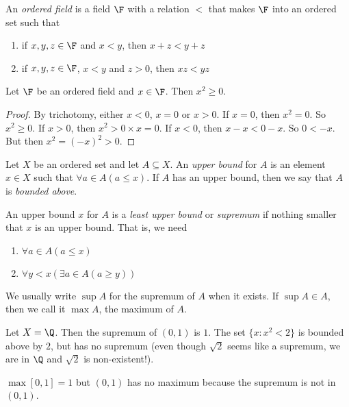 \documentclass[a4paper]{article}
\begin{document}
\begin{defi}
  An \emph{ordered field} is a field $\F$ with a relation $<$ that makes $\F$ into an ordered set such that
  \begin{enumerate}
    \item if $x, y, z \in \F$ and $x < y$, then $x + z < y + z$
    \item if $x, y, z \in \F$, $x < y$ and $z > 0$, then $xz < yz$
  \end{enumerate}
\end{defi}

\begin{lemma}
  Let $\F$ be an ordered field and $x\in \F$. Then $x^2 \geq 0$.
\end{lemma}

\begin{proof}
  By trichotomy, either $x < 0$, $x = 0$ or $x > 0$. If $x = 0$, then $x^2 = 0$. So $x^2 \geq 0$. If $x > 0$, then $x^2 > 0\times x = 0$. If $x < 0$, then $x - x < 0 - x$. So $0 < -x$. But then $x^2 = (-x)^2 > 0$.
\end{proof}

\begin{defi}
  Let $X$ be an ordered set and let $A\subseteq X$. An \emph{upper bound} for $A$ is an element $x\in X$ such that $\forall a\in A(a \leq x)$. If $A$ has an upper bound, then we say that $A$ is \emph{bounded above}.

  An upper bound $x$ for $A$ is a \emph{least upper bound} or \emph{supremum} if nothing smaller that $x$ is an upper bound. That is, we need
  \begin{enumerate}
    \item $\forall a\in A(a \leq x)$
    \item $\forall y < x(\exists a\in A(a \geq y))$
  \end{enumerate}

  We usually write $\sup A$ for the supremum of $A$ when it exists. If $\sup A\in A$, then we call it $\max A$, the maximum of $A$.
\end{defi}

\begin{eg}
  Let $X = \Q$. Then the supremum of $(0, 1)$ is $1$. The set $\{x: x^2 < 2\}$ is bounded above by $2$, but has no supremum (even though $\sqrt{2}$ seems like a supremum, we are in $\Q$ and $\sqrt{2}$ is non-existent!).

  $\max [0, 1] = 1$ but $(0, 1)$ has no maximum because the supremum is not in $(0, 1)$.
\end{eg}
\end{document}
